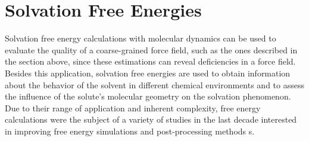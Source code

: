 \section{Solvation Free Energies}

Solvation free energy calculations with molecular dynamics can be used to evaluate the quality of a coarse-grained force field, such as the ones described in the section above, since these estimations can reveal deficiencies in a force field. Besides this application, solvation free energies are used to obtain information about the behavior of the solvent in different chemical environments and to assess the influence of the solute's molecular geometry on the solvation phenomenon. Due to their range of application and inherent complexity, free energy calculations were the subject of a variety of studies in the last decade interested in improving free energy simulations and post-processing methods \cite{mbar,bareva,dexp,gdel}s.

